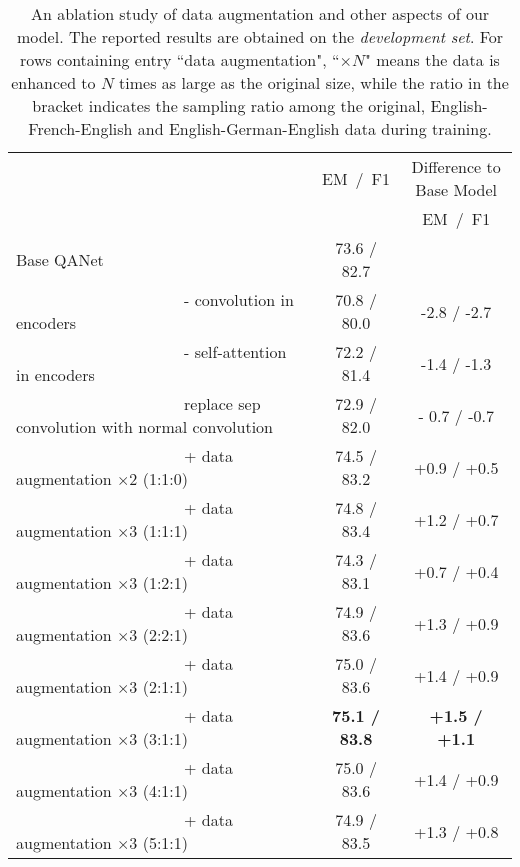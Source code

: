\documentclass{article} \usepackage{iclr2018_conference,times}
\begin{document}
\begin{table}[h!]
\small
\begin{center}
\begin{tabular}{lcc}
\hline & EM~/~F1  & Difference to Base Model\\
      &         &  EM~/~F1 \\
\hline
Base QANet &  73.6 / 82.7 \\\hline 
~~~~~~~~~~~~~~~~~~~~~- convolution in encoders & 70.8 / 80.0 & -2.8 / -2.7 \\
~~~~~~~~~~~~~~~~~~~~~- self-attention in encoders  & 72.2 / 81.4 & -1.4 / -1.3\\
~~~~~~~~~~~~~~~~~~~~~replace sep convolution with normal convolution  & 72.9 / 82.0 &  - 0.7 / -0.7\\\hline
~~~~~~~~~~~~~~~~~~~~~+ data augmentation $\times$2 (1:1:0) &  74.5 / 83.2 & +0.9 / +0.5 \\ 
~~~~~~~~~~~~~~~~~~~~~+ data augmentation $\times$3 (1:1:1) &  74.8 / 83.4 & +1.2 / +0.7 \\ 
~~~~~~~~~~~~~~~~~~~~~+ data augmentation $\times$3 (1:2:1) &  74.3 / 83.1 & +0.7 / +0.4 \\ 
~~~~~~~~~~~~~~~~~~~~~+ data augmentation $\times$3 (2:2:1) &  74.9 / 83.6 & +1.3 / +0.9 \\ 
~~~~~~~~~~~~~~~~~~~~~+ data augmentation $\times$3 (2:1:1) &  75.0 / 83.6 & +1.4 / +0.9 \\ 
~~~~~~~~~~~~~~~~~~~~~+ data augmentation $\times$3 (3:1:1) &  \textbf{75.1 / 83.8} & \textbf{+1.5 / +1.1}\\ 
~~~~~~~~~~~~~~~~~~~~~+ data augmentation $\times$3 (4:1:1) &  75.0 / 83.6 & +1.4 / +0.9\\ 
~~~~~~~~~~~~~~~~~~~~~+ data augmentation $\times$3 (5:1:1) &  74.9 / 83.5 & +1.3 / +0.8\\ 
 \hline \end{tabular}
\end{center}
\caption{An ablation study of data augmentation and other aspects of our model. The reported results are obtained on the \emph{development set}. For rows containing entry ``data augmentation",
``$\times N$" means the data is enhanced to $N$ times as large as the original size, while
the ratio in the bracket indicates the sampling ratio among the original, English-French-English and English-German-English data during training.}
\label{table:squad_ablation}
\end{table}
\end{document}
